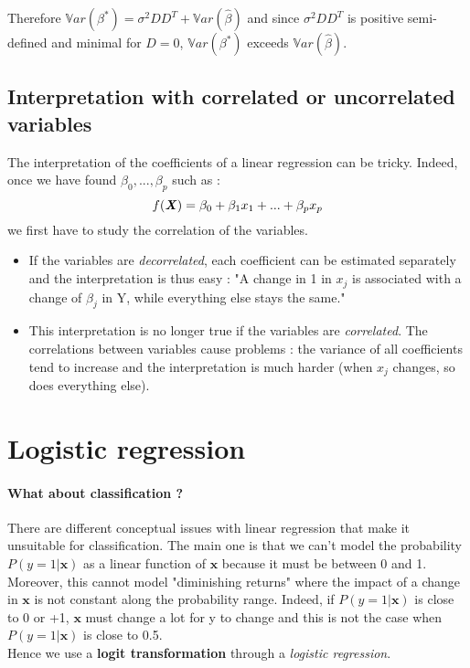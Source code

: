 \documentclass[a4paper,12pt]{article}
\newcommand{\xx}{{\bm x}}
\begin{document}
Therefore \(\mathbb{V}ar(\beta^*) = \sigma^2 D D^T +  \mathbb{V}ar(\hat{\beta})\) and since \(\sigma^2 D D^T \) is positive semi-defined and minimal for \(D = 0\),  \(\mathbb{V}ar(\beta^*)\) exceeds \(\mathbb{V}ar(\hat{\beta})\).


\subsection{Interpretation with correlated or uncorrelated variables}

The interpretation of the coefficients of a linear regression can be tricky. Indeed, once we have found \(\beta_0,...,\beta_p\) such as :
\[f(\textbf{\textit{X}}) = \beta_0 + \beta_1 x_1 + ... + \beta_p x_p\]
we first have to study the correlation of the variables.
\begin{itemize}
\item If the variables are \textit{decorrelated}, each coefficient can be estimated separately and the interpretation is thus easy : "A change in 1 in \(x_j\) is associated with a change of \(\beta_j\) in Y, while everything else stays the same."
\end{itemize}
\begin{itemize}
\item This interpretation is no longer true if the variables are \textit{correlated}. The correlations between variables cause problems : the variance of all coefficients tend to increase and the interpretation is much harder (when \(x_j\) changes, so does everything else).
\end{itemize}

\section{Logistic regression}

\paragraph{What about classification ?}
There are different conceptual issues with linear regression that make it unsuitable for classification. The main one is that we can't model the probability \(P(y=1|\xx)\) as a linear function of $\xx$ because it must be between 0 and 1. Moreover, this cannot model "diminishing returns" where the impact of a change in $\xx$ is not constant along the probability range. Indeed, if \(P(y=1|\xx)\) is close to 0 or +1, $\xx$ must change a lot for y to change and this is not the case when \(P(y=1|\xx)\) is close to 0.5. \\
Hence we use a \textbf{logit transformation} through a \textit{logistic regression}.\\
\end{document}
